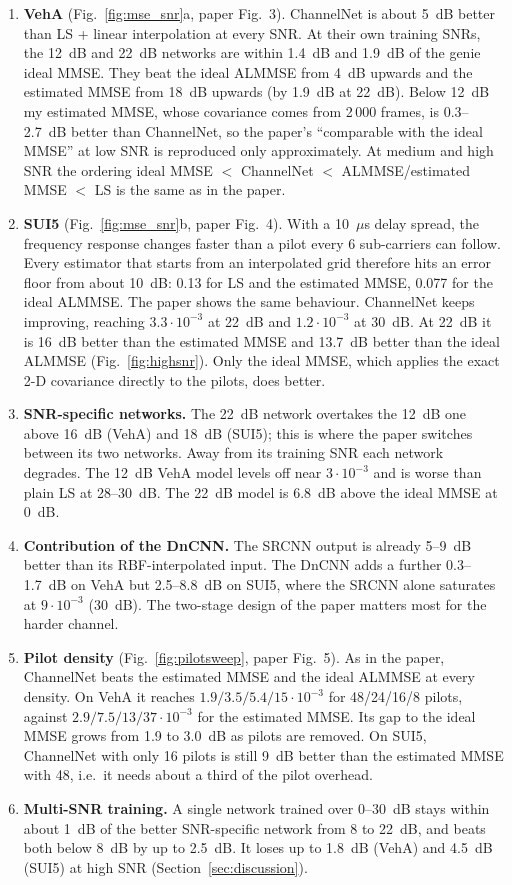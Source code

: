 \documentclass[10pt,a4paper]{article}
\begin{document}
\begin{enumerate}
  \item \textbf{VehA} (Fig.~\ref{fig:mse_snr}a, paper Fig.~3). ChannelNet is about 5~dB better than LS
    + linear interpolation at every SNR. At their own training SNRs, the 12~dB and 22~dB networks are
    within 1.4~dB and 1.9~dB of the genie ideal MMSE. They beat the ideal ALMMSE from 4~dB upwards and
    the estimated MMSE from 18~dB upwards (by 1.9~dB at 22~dB). Below 12~dB my estimated MMSE, whose
    covariance comes from 2\,000 frames, is 0.3--2.7~dB better than ChannelNet, so the paper's
    ``comparable with the ideal MMSE'' at low SNR is reproduced only approximately. At medium and high
    SNR the ordering ideal MMSE $<$ ChannelNet $<$ ALMMSE/estimated MMSE $<$ LS is the same as in the
    paper.
  \item \textbf{SUI5} (Fig.~\ref{fig:mse_snr}b, paper Fig.~4). With a 10~$\mu$s delay spread, the
    frequency response changes faster than a pilot every 6 sub-carriers can follow. Every estimator
    that starts from an interpolated grid therefore hits an error floor from about 10~dB: 0.13 for LS
    and the estimated MMSE, 0.077 for the ideal ALMMSE. The paper shows the same behaviour.
    ChannelNet keeps improving, reaching $3.3\cdot10^{-3}$ at 22~dB and $1.2\cdot10^{-3}$ at 30~dB.
    At 22~dB it is 16~dB better than the estimated MMSE and 13.7~dB better than the ideal ALMMSE
    (Fig.~\ref{fig:highsnr}). Only the ideal MMSE, which applies the exact 2-D covariance directly to
    the pilots, does better.
  \item \textbf{SNR-specific networks.} The 22~dB network overtakes the 12~dB one above 16~dB (VehA) and
    18~dB (SUI5); this is where the paper switches between its two networks. Away from its training
    SNR each network degrades. The 12~dB VehA model levels off near $3\cdot10^{-3}$ and is worse than
    plain LS at 28--30~dB. The 22~dB model is 6.8~dB above the ideal MMSE at 0~dB.
  \item \textbf{Contribution of the DnCNN.} The SRCNN output is already 5--9~dB better than its
    RBF-interpolated input. The DnCNN adds a further 0.3--1.7~dB on VehA but 2.5--8.8~dB on SUI5,
    where the SRCNN alone saturates at $9\cdot10^{-3}$ (30~dB). The two-stage design of the paper
    matters most for the harder channel.
  \item \textbf{Pilot density} (Fig.~\ref{fig:pilotsweep}, paper Fig.~5). As in the paper, ChannelNet
    beats the estimated MMSE and the ideal ALMMSE at every density. On VehA it reaches
    $1.9/3.5/5.4/15\cdot10^{-3}$ for 48/24/16/8 pilots, against $2.9/7.5/13/37\cdot10^{-3}$ for the
    estimated MMSE. Its gap to the ideal MMSE grows from 1.9 to 3.0~dB as pilots are removed. On SUI5,
    ChannelNet with only 16 pilots is still 9~dB better than the estimated MMSE with 48, i.e.\ it needs
    about a third of the pilot overhead.
  \item \textbf{Multi-SNR training.} A single network trained over 0--30~dB stays within about 1~dB of
    the better SNR-specific network from 8 to 22~dB, and beats both below 8~dB by up to 2.5~dB. It
    loses up to 1.8~dB (VehA) and 4.5~dB (SUI5) at high SNR (Section~\ref{sec:discussion}).
\end{enumerate}
\end{document}
